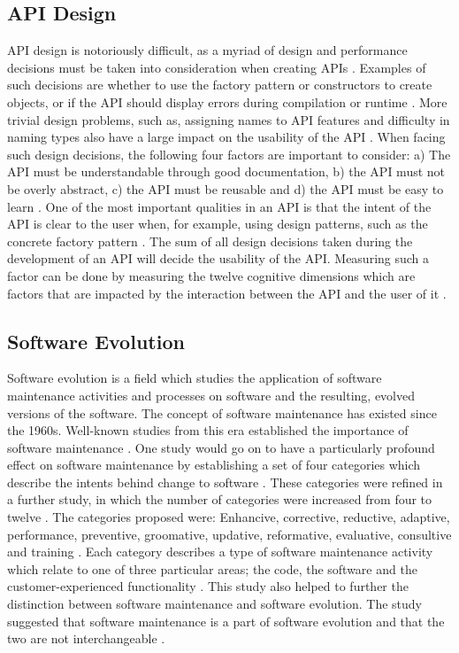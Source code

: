 \documentclass{sig-alternate}
\begin{document}
\subsection{API Design} \label{api_design}
API design is notoriously difficult, as a myriad of design and performance decisions must be taken into consideration when creating APIs \cite{stylos2006comparing} \cite{afonso2012evaluating} \cite{bloch2008effective}. Examples of such decisions are whether to use the factory pattern or constructors to create objects, or if the API should display errors during compilation or runtime \cite{stylos2006comparing}. More trivial design problems, such as, assigning names to API features and difficulty in naming types also have a large impact on the usability of the API \cite{shi2011empirical}. When facing such design decisions, the following four factors are important to consider: a) The API  must be understandable through good documentation, b) the API must not be overly abstract, c) the API must be reusable and d) the API must be easy to learn \cite{shi2011empirical}. One of the most important qualities in an API is that the intent of the API is clear to the user when, for example, using design patterns, such as the concrete factory pattern \cite{stylos2006comparing} \cite{shi2011empirical}. The sum of all design decisions taken during the development of an API will decide the usability of the API. Measuring such a factor can be done by measuring the twelve cognitive dimensions which are factors that are impacted by the interaction between the API and the user of it \cite{clarke2004measuring}. 


\subsection{Software Evolution} \label{software_evolution}
Software evolution is a field which studies the application of software maintenance activities and processes on software and the resulting, evolved versions of the software. The concept of software maintenance has existed since the 1960s. Well-known studies from this era established the importance of software maintenance \cite{lientz1980software}. One study would go on to have a particularly profound effect on software maintenance by establishing a set of four categories which describe the intents behind change to software \cite{lientz1980software}. These categories were refined in a further study, in which the number of categories were increased from four to twelve \cite{chapin2001types}. The categories proposed were: Enhancive, corrective, reductive, adaptive, performance, preventive, groomative, updative, reformative, evaluative, consultive and training \cite{chapin2001types}. Each category describes a type of software maintenance activity which relate to one of three particular areas; the code, the software and the customer-experienced functionality \cite{chapin2001types}. This study also helped to further the distinction between software maintenance and software evolution. The study suggested that software maintenance is a part of software evolution and that the two are not interchangeable \cite{chapin2001types}. 
\end{document}
